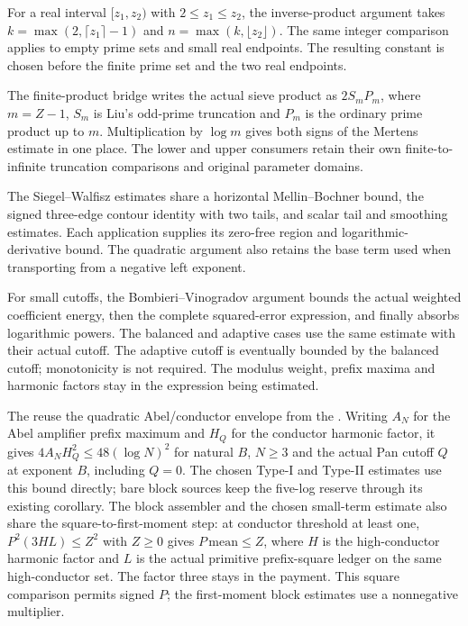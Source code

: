 For a real interval $[z_1,z_2)$ with $2\le z_1\le z_2$, the inverse-product
argument takes $k=\max(2,\lceil z_1\rceil-1)$ and
$n=\max(k,\lfloor z_2\rfloor)$. The same integer comparison applies to empty
prime sets and small real endpoints. The resulting constant is chosen before
the finite prime set and the two real endpoints.

The finite-product bridge writes the actual sieve product as $2S_mP_m$,
where $m=Z-1$, $S_m$ is Liu's odd-prime truncation and $P_m$ is the ordinary
prime product up to $m$. Multiplication by $\log m$ gives both signs of the
Mertens estimate in one place. The lower and upper consumers retain their
own finite-to-infinite truncation comparisons and original parameter domains.

The Siegel--Walfisz estimates share a horizontal Mellin--Bochner bound,
the signed three-edge contour identity with two tails, and scalar tail and
smoothing estimates. Each application supplies its zero-free region and
logarithmic-derivative bound. The quadratic argument also retains the base
term used when transporting from a negative left exponent.

For small cutoffs, the Bombieri--Vinogradov argument bounds the actual
weighted coefficient energy, then the complete squared-error expression,
and finally absorbs logarithmic powers. The balanced and adaptive cases use the same
estimate with their actual cutoff. The adaptive cutoff is eventually bounded
by the balanced cutoff; monotonicity is not required. The modulus weight,
prefix maxima and harmonic factors stay in the expression being estimated.

The 
reuse the quadratic Abel/conductor envelope from the
.
Writing $A_N$ for the Abel amplifier prefix maximum and $H_Q$ for the
conductor harmonic factor, it gives $4A_NH_Q^2\le48(\log N)^2$ for natural
$B$, $N\ge3$ and the actual Pan cutoff $Q$ at exponent $B$,
including $Q=0$. The chosen Type-I and Type-II estimates use this bound
directly; bare block sources keep the five-log reserve through its existing
corollary. The block assembler and the chosen small-term estimate also share
the square-to-first-moment step: at conductor threshold at least one,
$P^2(3HL)\le Z^2$ with $Z\ge0$ gives $P\,\mathrm{mean}\le Z$, where $H$ is the
high-conductor harmonic factor and $L$ is the actual primitive prefix-square
ledger on the same high-conductor set. The factor three stays in the payment.
This square comparison permits signed $P$; the first-moment block estimates
use a nonnegative multiplier.

